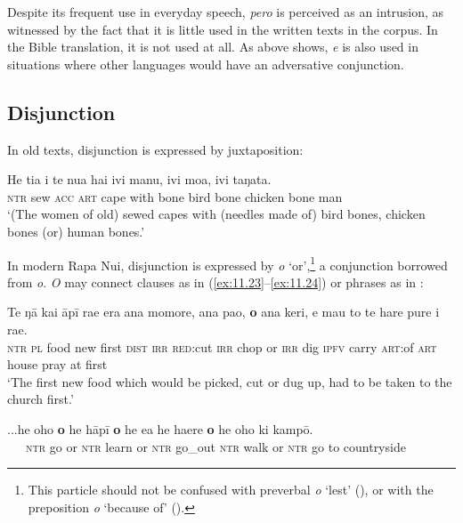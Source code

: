 Despite its frequent use in everyday speech, \textit{pero} is perceived as an intrusion, as witnessed by the fact that it is little used in the written texts in the corpus. In the Bible translation, it is not used at all. As  above shows, \textit{{\ꞌ}e} is also used in situations where other languages would have an adversative conjunction.

\subsection{Disjunction}\label{sec:11.2.2}

In old texts, disjunction is expressed by juxtaposition:

\ea\label{ex:11.22}
\gll He tia i te nua hai ivi manu, ivi moa, ivi taŋata.\\
\textsc{ntr} sew \textsc{acc} \textsc{art} cape with bone bird bone chicken bone man\\

\glt
‘(The women of old) sewed capes with (needles made of) bird bones, chicken bones (or) human bones.’ \textstyleExampleref{[Ley-5-04.013]}
\z

In modern Rapa Nui, disjunction is expressed by \textit{{\ꞌ}o} ‘or’,\footnote{\label{fn:505}This particle should not be confused with preverbal \textit{{\ꞌ}o} ‘lest’ (), or with the preposition \textit{{\ꞌ}o} ‘because of’ ().} a conjunction borrowed from  \textit{o}. \textit{{\ꞌ}O} may connect clauses as in (\ref{ex:11.23}–\ref{ex:11.24}) or phrases as in :

\ea\label{ex:11.23}
\gll Te ŋā kai {\ꞌ}āpī ra{\ꞌ}e era ana momore, ana pa{\ꞌ}o, \textbf{{\ꞌ}o} ana keri, e ma{\ꞌ}u  to te hare pure {\ꞌ}i ra{\ꞌ}e.\\
\textsc{ntr} \textsc{pl} food new first \textsc{dist} \textsc{irr} \textsc{red}:cut \textsc{irr} chop or \textsc{irr} dig \textsc{ipfv} carry  \textsc{art}:of \textsc{art} house pray at first\\

\glt 
‘The first new food which would be picked, cut or dug up, had to be taken to the church first.’ \textstyleExampleref{[R539-3.150]}
\z

\ea\label{ex:11.24}
\gll ...he oho \textbf{{\ꞌ}o} he hāpī \textbf{{\ꞌ}o} he e{\ꞌ}a he ha{\ꞌ}ere \textbf{{\ꞌ}o} he oho ki kampō.\\
~~~\textsc{ntr} go or \textsc{ntr} learn or \textsc{ntr} go\_out \textsc{ntr} walk or \textsc{ntr} go to countryside\\

